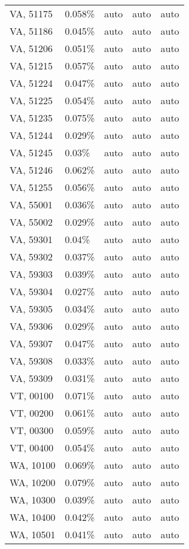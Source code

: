 \begin{longtable}[]{@{}lllll@{}}
VA, 51175 & 0.058\% & auto & auto & auto \\
VA, 51186 & 0.045\% & auto & auto & auto \\
VA, 51206 & 0.051\% & auto & auto & auto \\
VA, 51215 & 0.057\% & auto & auto & auto \\
VA, 51224 & 0.047\% & auto & auto & auto \\
VA, 51225 & 0.054\% & auto & auto & auto \\
VA, 51235 & 0.075\% & auto & auto & auto \\
VA, 51244 & 0.029\% & auto & auto & auto \\
VA, 51245 & 0.03\% & auto & auto & auto \\
VA, 51246 & 0.062\% & auto & auto & auto \\
VA, 51255 & 0.056\% & auto & auto & auto \\
VA, 55001 & 0.036\% & auto & auto & auto \\
VA, 55002 & 0.029\% & auto & auto & auto \\
VA, 59301 & 0.04\% & auto & auto & auto \\
VA, 59302 & 0.037\% & auto & auto & auto \\
VA, 59303 & 0.039\% & auto & auto & auto \\
VA, 59304 & 0.027\% & auto & auto & auto \\
VA, 59305 & 0.034\% & auto & auto & auto \\
VA, 59306 & 0.029\% & auto & auto & auto \\
VA, 59307 & 0.047\% & auto & auto & auto \\
VA, 59308 & 0.033\% & auto & auto & auto \\
VA, 59309 & 0.031\% & auto & auto & auto \\
VT, 00100 & 0.071\% & auto & auto & auto \\
VT, 00200 & 0.061\% & auto & auto & auto \\
VT, 00300 & 0.059\% & auto & auto & auto \\
VT, 00400 & 0.054\% & auto & auto & auto \\
WA, 10100 & 0.069\% & auto & auto & auto \\
WA, 10200 & 0.079\% & auto & auto & auto \\
WA, 10300 & 0.039\% & auto & auto & auto \\
WA, 10400 & 0.042\% & auto & auto & auto \\
WA, 10501 & 0.041\% & auto & auto & auto \\

\end{longtable}
